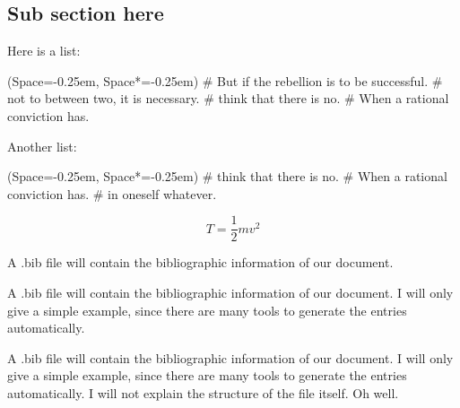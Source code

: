 \documentclass[12pt, a4paper, twoside]{article}%
\numberwithin{equation}{section}
\newcommand{\listSpace}{-0.25em}
\begin{document}
\subsection{Sub section here}
\blindtext

Here is a list:
\begin{easylist}[itemize]
	\ListProperties(Space=\listSpace, Space*=\listSpace)
	# But if the rebellion is to be successful.
	# not to  between two, it is necessary.
	# think that there is no.
	# When a rational conviction has.
\end{easylist}

Another list:
\begin{easylist}[enumerate]
	\ListProperties(Space=\listSpace, Space*=\listSpace)
	# think that there is no.
	# When a rational conviction has.
	# in oneself whatever.
\end{easylist}

\begin{equation}
	T = \frac{1}{2}m v^2
\end{equation}

A .bib file will contain the bibliographic information of our document.

A .bib file will contain the bibliographic information of our document. I will only give a simple example, since there are many tools to generate the entries automatically.

A .bib file will contain the bibliographic information of our document. I will only give a simple example, since there are many tools to generate the entries automatically. I will not explain the structure of the file itself. Oh well.


\end{document}

